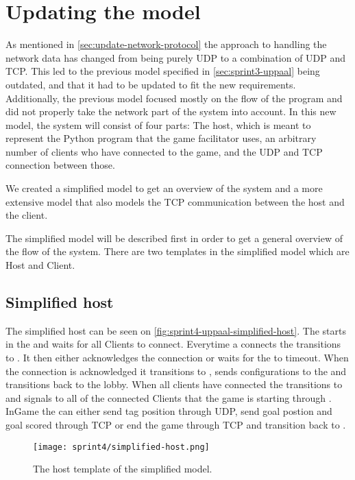 \section{Updating the \uppaal model}
As mentioned in \autoref{sec:update-network-protocol} the approach to handling the network data has changed from being purely UDP to a combination of UDP and TCP.
This led to the previous \uppaal model specified in \autoref{sec:sprint3-uppaal} being outdated, and that it had to be updated to fit the new requirements.
\\
Additionally, the previous model focused mostly on the flow of the program and did not properly take the network part of the system into account.
In this new model, the system will consist of four parts: The host, which is meant to represent the Python program that the game facilitator uses, an arbitrary number of clients who have connected to the game, and the UDP and TCP connection between those.

We created a simplified model to get an overview of the system and a more extensive model that also models the TCP communication between the host and the client.

The simplified model will be described first in order to get a general overview of the flow of the system.
There are two templates in the simplified model which are Host and Client.

\subsection*{Simplified host}
The simplified host can be seen on \autoref{fig:sprint4-uppaal-simplified-host}. 
The  starts in the  and waits for all Clients to connect.
Everytime a  connects the  transitions to  .
It then either acknowledges the connection or waits for the   to timeout.
When the connection is acknowledged it transitions to , sends configurations to the  and transitions back to the lobby.
When all clients have connected the  transitions to  and signals to all of the connected Clients that the game is starting through .
InGame the  can either send tag position through UDP, send goal postion and goal scored through TCP or end the game through TCP and transition back to .
\begin{figure}[h]
    \centering
    \texttt{[image: sprint4/simplified-host.png]}
    \caption{The host template of the simplified \uppaal model.}
    \label{fig:sprint4-uppaal-simplified-host}
\end{figure}

